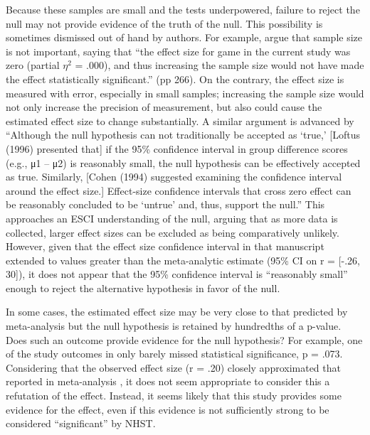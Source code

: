 \documentclass[fignum,nobf,man]{apa}
\begin{document}
Because these samples are small and the tests underpowered, failure to reject the null may not provide evidence of the truth of the null.  This possibility is sometimes dismissed out of hand by authors. For example, \citet{Adachi:Willoughby:2011} argue that sample size is not important, saying that ``the effect size for game in the current study was zero (partial $\eta^2$ = .000), and thus increasing the sample size would not have made the effect statistically significant.'' (pp 266).  On the contrary, the effect size is measured with error, especially in small samples; increasing the sample size would not only increase the precision of measurement, but also could cause the estimated effect size to change substantially. A similar argument is advanced by \citet{Ferguson:etal:2008} %
``Although the null hypothesis can not traditionally be accepted as `true,' [Loftus (1996) presented that] if the 95\% confidence interval in group difference scores (e.g., μ1 – μ2) is reasonably small, the null hypothesis can be effectively accepted as true. Similarly, [Cohen (1994) suggested examining the confidence interval around the effect size.] Effect-size confidence intervals that cross zero effect can be reasonably concluded to be ‘untrue' and, thus, support the null.''  %
This approaches an ESCI understanding of the null, arguing that as more data is collected, larger effect sizes can be excluded as being comparatively unlikely. However, given that the effect size confidence interval in that manuscript extended to values greater than the meta-analytic estimate (95\% CI on r = [-.26, 30]), it does not appear that the 95\% confidence interval is ``reasonably small'' enough to reject the alternative hypothesis in favor of the null.

In some cases, the estimated effect size may be very close to that predicted by meta-analysis but the null hypothesis is retained by hundredths of a p-value. Does such an outcome provide evidence for the null hypothesis? For example, one of the study outcomes in \citet{Elson:etal:2013} only barely missed statistical significance, p = .073. Considering that the observed effect size (r = .20) closely approximated that reported in meta-analysis \citep[r = .21,][]{Anderson:etal:2010}, it does not seem appropriate to consider this a refutation of the effect. %
Instead, it seems likely that this study provides some evidence for the effect, even if this evidence is not sufficiently strong to be considered ``significant'' by NHST. 
\end{document}
